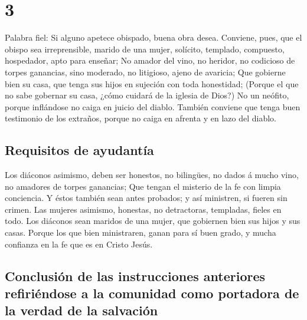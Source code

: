 \hypertarget{section-54-3}{%
\section{3}\label{section-54-3}}

 Palabra fiel: Si alguno apetece obispado, buena obra
desea.  Conviene, pues, que el obispo sea irreprensible,
marido de una mujer, solícito, templado, compuesto, hospedador, apto
para enseñar;  No amador del vino, no heridor, no
codicioso de torpes ganancias, sino moderado, no litigioso, ajeno de
avaricia;  Que gobierne bien su casa, que tenga sus hijos
en sujeción con toda honestidad;  (Porque el que no sabe
gobernar su casa, ¿cómo cuidará de la iglesia de Dios?) 
No un neófito, porque inflándose no caiga en juicio del diablo.
 También conviene que tenga buen testimonio de los
extraños, porque no caiga en afrenta y en lazo del diablo.

\hypertarget{requisitos-de-ayudantuxeda}{%
\subsection{Requisitos de ayudantía}\label{requisitos-de-ayudantuxeda}}

 Los diáconos asimismo, deben ser honestos, no bilingües,
no dados á mucho vino, no amadores de torpes ganancias; 
Que tengan el misterio de la fe con limpia conciencia.  Y
éstos también sean antes probados; y así ministren, si fueren sin
crimen.  Las mujeres asimismo, honestas, no detractoras,
templadas, fieles en todo.  Los diáconos sean maridos de
una mujer, que gobiernen bien sus hijos y sus casas. 
Porque los que bien ministraren, ganan para sí buen grado, y mucha
confianza en la fe que es en Cristo Jesús.

\hypertarget{conclusiuxf3n-de-las-instrucciones-anteriores-refiriuxe9ndose-a-la-comunidad-como-portadora-de-la-verdad-de-la-salvaciuxf3n}{%
\subsection{Conclusión de las instrucciones anteriores refiriéndose a la
comunidad como portadora de la verdad de la
salvación}\label{conclusiuxf3n-de-las-instrucciones-anteriores-refiriuxe9ndose-a-la-comunidad-como-portadora-de-la-verdad-de-la-salvaciuxf3n}}

